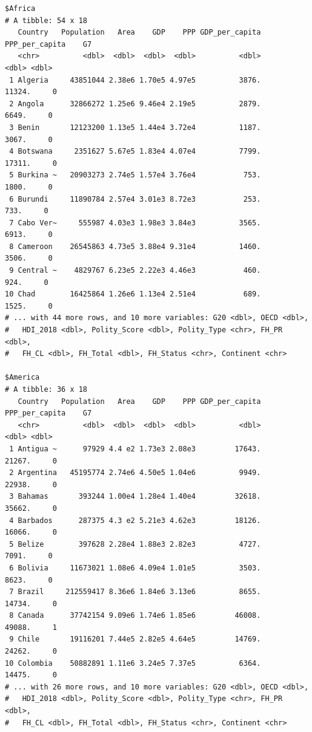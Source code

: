 \documentclass[
  a4paper,
  pandoc,
  ja=standard,
  jafont=haranoaji]{bxjsbook}
\begin{document}
\begin{verbatim}
$Africa
# A tibble: 54 x 18
   Country   Population   Area    GDP    PPP GDP_per_capita PPP_per_capita    G7
   <chr>          <dbl>  <dbl>  <dbl>  <dbl>          <dbl>          <dbl> <dbl>
 1 Algeria     43851044 2.38e6 1.70e5 4.97e5          3876.         11324.     0
 2 Angola      32866272 1.25e6 9.46e4 2.19e5          2879.          6649.     0
 3 Benin       12123200 1.13e5 1.44e4 3.72e4          1187.          3067.     0
 4 Botswana     2351627 5.67e5 1.83e4 4.07e4          7799.         17311.     0
 5 Burkina ~   20903273 2.74e5 1.57e4 3.76e4           753.          1800.     0
 6 Burundi     11890784 2.57e4 3.01e3 8.72e3           253.           733.     0
 7 Cabo Ver~     555987 4.03e3 1.98e3 3.84e3          3565.          6913.     0
 8 Cameroon    26545863 4.73e5 3.88e4 9.31e4          1460.          3506.     0
 9 Central ~    4829767 6.23e5 2.22e3 4.46e3           460.           924.     0
10 Chad        16425864 1.26e6 1.13e4 2.51e4           689.          1525.     0
# ... with 44 more rows, and 10 more variables: G20 <dbl>, OECD <dbl>,
#   HDI_2018 <dbl>, Polity_Score <dbl>, Polity_Type <chr>, FH_PR <dbl>,
#   FH_CL <dbl>, FH_Total <dbl>, FH_Status <chr>, Continent <chr>

$America
# A tibble: 36 x 18
   Country   Population   Area    GDP    PPP GDP_per_capita PPP_per_capita    G7
   <chr>          <dbl>  <dbl>  <dbl>  <dbl>          <dbl>          <dbl> <dbl>
 1 Antigua ~      97929 4.4 e2 1.73e3 2.08e3         17643.         21267.     0
 2 Argentina   45195774 2.74e6 4.50e5 1.04e6          9949.         22938.     0
 3 Bahamas       393244 1.00e4 1.28e4 1.40e4         32618.         35662.     0
 4 Barbados      287375 4.3 e2 5.21e3 4.62e3         18126.         16066.     0
 5 Belize        397628 2.28e4 1.88e3 2.82e3          4727.          7091.     0
 6 Bolivia     11673021 1.08e6 4.09e4 1.01e5          3503.          8623.     0
 7 Brazil     212559417 8.36e6 1.84e6 3.13e6          8655.         14734.     0
 8 Canada      37742154 9.09e6 1.74e6 1.85e6         46008.         49088.     1
 9 Chile       19116201 7.44e5 2.82e5 4.64e5         14769.         24262.     0
10 Colombia    50882891 1.11e6 3.24e5 7.37e5          6364.         14475.     0
# ... with 26 more rows, and 10 more variables: G20 <dbl>, OECD <dbl>,
#   HDI_2018 <dbl>, Polity_Score <dbl>, Polity_Type <chr>, FH_PR <dbl>,
#   FH_CL <dbl>, FH_Total <dbl>, FH_Status <chr>, Continent <chr>


\end{verbatim}
\end{document}
